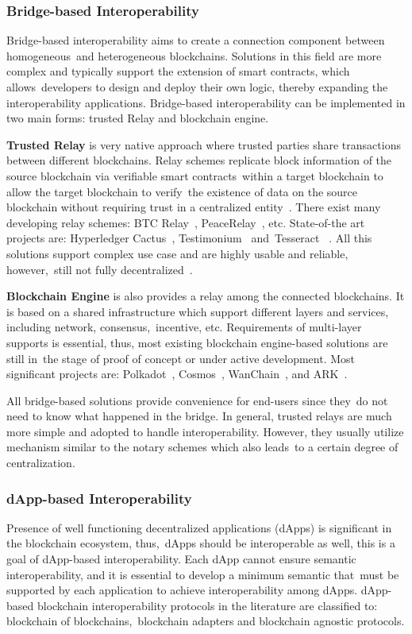 \subsubsection{Bridge-based Interoperability}
Bridge-based interoperability aims to create a connection component between homogeneous\
and heterogeneous blockchains.
Solutions in this field are more complex and typically support the extension of smart contracts, which allows\
developers to design and deploy their own logic, thereby expanding the interoperability applications.
Bridge-based interoperability can be implemented in two main forms: trusted Relay and blockchain engine.

\textbf{Trusted Relay} is very native approach where trusted parties share transactions between different blockchains.
Relay schemes replicate block information of the source blockchain via verifiable smart contracts\
within a target blockchain to allow the target blockchain to verify\
the existence of data on the source blockchain without requiring trust in a centralized entity~\cite{buterin2016}.
There exist many developing relay schemes: BTC Relay~\cite{Chow2016}, PeaceRelay~\cite{Luu2019}, etc.
State-of-the art projects are: Hyperledger Cactus~\cite{Hyperledger2020}, Testimonium~\cite{Frauenthaler2020} and\
Tesseract ~\cite{cryptoeprint:2017/1153}.
All this solutions support complex use case and are highly usable and reliable, however,\
still not fully decentralized~\cite{cryptoeprint:2021/537}.

\textbf{Blockchain Engine} is also provides a relay among the connected blockchains.
It is based on a shared infrastructure which support different layers and services, including network, consensus,\
incentive, etc.
Requirements of multi-layer supports is essential, thus, most existing blockchain engine-based solutions are still in\
the stage of proof of concept or under active development.
Most significant projects are: Polkadot~\cite{cryptoeprint:2020/641}, Cosmos~\cite{Kwon2019},
WanChain~\cite{Wanchain}, and ARK~\cite{ARK}.

All bridge-based solutions provide convenience for end-users since they\
do not need to know what happened in the bridge.
In general, trusted relays are much more simple and adopted to handle interoperability.
However, they usually utilize mechanism similar to the notary schemes which also leads\
to a certain degree of centralization.

\subsubsection{dApp-based Interoperability}
Presence of well functioning decentralized applications (dApps) is significant in the blockchain ecosystem, thus,\
dApps should be interoperable as well, this is a goal of dApp-based interoperability.
Each dApp cannot ensure semantic interoperability, and it is essential to develop a minimum semantic that\
must be supported by each application to achieve interoperability among dApps.
dApp-based blockchain interoperability protocols in the literature are classified to: blockchain of blockchains,\
blockchain adapters and blockchain agnostic protocols.

